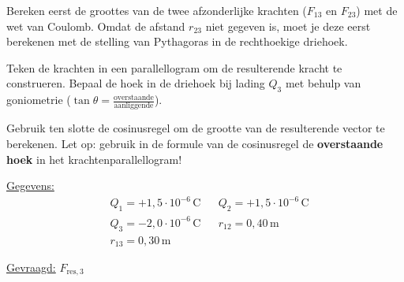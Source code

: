 \documentclass{ximera}
\begin{document}
\begin{exercise}
    \begin{hint}
        Bereken eerst de groottes van de twee afzonderlijke krachten ($F_{13}$ en $F_{23}$) met de wet van Coulomb. Omdat de afstand $r_{23}$ niet gegeven is, moet je deze eerst berekenen met de stelling van Pythagoras in de rechthoekige driehoek.
    \end{hint}
    \begin{hint}
        Teken de krachten in een parallellogram om de resulterende kracht te construeren. Bepaal de hoek in de driehoek bij lading $Q_3$ met behulp van goniometrie ($\tan \theta = \frac{\text{overstaande}}{\text{aanliggende}}$).
    \end{hint}
    \begin{hint}
        Gebruik ten slotte de cosinusregel om de grootte van de resulterende vector te berekenen. Let op: gebruik in de formule van de cosinusregel de \textbf{overstaande hoek} in het krachtenparallellogram!
    \end{hint}

    \begin{solution}\nl
        \underline{Gegevens:}
        \begin{align*}
            & Q_{1} = +1{,}5 \cdot 10^{-6} \, \mathrm{C} & & Q_{2} = +1{,}5 \cdot 10^{-6} \, \mathrm{C} \\
            & Q_{3} = -2{,}0 \cdot 10^{-6} \, \mathrm{C} & & r_{12} = 0{,}40 \, \mathrm{m}\\
            & r_{13} = 0{,}30 \, \mathrm{m} & & 
        \end{align*}

        \underline{Gevraagd:} $ F_{\text{res},3}$\\ 


\end{solution}
\end{exercise}
\end{document}
